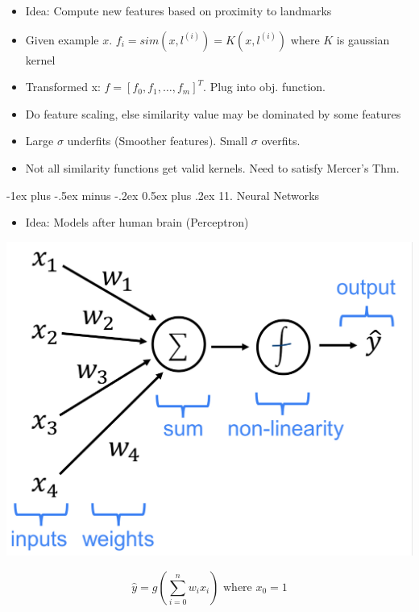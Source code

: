 \documentclass{article}
\makeatletter
\renewcommand{\section}{\@startsection{section}{1}{0mm}%
    {-1ex plus -.5ex minus -.2ex}%
    {0.5ex plus .2ex}%
{\normalfont\large\bfseries}}
\makeatother
\begin{document}
\begin{multicols*}{3}
\begin{itemize}
    \item Idea: Compute new features based on proximity to landmarks
    \item Given example $x$. $f_i = sim (x, l^{(i)}) = K(x, l^{(i)})$ where $K$ is gaussian kernel
    \item Transformed x: $f = [f_0, f_1, \dots, f_m]^T$. Plug into obj. function.
    \item Do feature scaling, else similarity value may be dominated by some features
    \item Large $\sigma$ underfits (Smoother features). Small $\sigma$ overfits.
    \item Not all similarity functions get valid kernels. Need to satisfy Mercer's Thm.
\end{itemize}

\section{11. Neural Networks}

\begin{itemize}
    \item Idea: Models after human brain (Perceptron)
\end{itemize}

\begin{multicols*}{2}
    
    \includegraphics[scale=0.1]{perceptron}

    \[\hat{y} = g(\sum_{i = 0}^{n} w_i x_i) \text{ where } x_0 = 1\]


\end{multicols*}
\end{multicols*}
\end{document}
